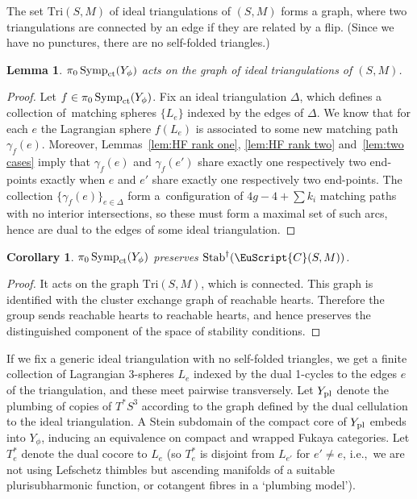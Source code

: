 \documentclass[10pt,a4paper]{amsart}
\newcommand{\scrC}{\EuScript{C}}
\DeclareMathOperator{\Symp}{Symp}
\newtheorem{lem}[thm]{Lemma}
\newtheorem{cor}[thm]{Corollary}
\theoremstyle{definition}
\numberwithin{equation}{section}
\begin{document}
The set $\mathrm{Tri}(S,M)$ of ideal triangulations of $(S,M)$ forms a graph, where two triangulations are connected by an edge if they are related by a flip. (Since we have no punctures, there are no self-folded triangles.)

\begin{lem}
$\pi_0\Symp_{\rm ct}(Y_{\phi})$ acts on the graph of ideal triangulations of $(S,M)$.
\end{lem}

\begin{proof}
Let $f \in \pi_0\Symp_{\rm ct}(Y_{\phi})$. Fix an ideal triangulation $\Delta$, which defines a collection of~matching spheres $\{L_e\}$ indexed by the edges of $\Delta$. We know that for each $e$ the Lagrangian sphere $f(L_e)$ is associated to some new matching path $\gamma_f(e)$. Moreover, Lemmas~\ref{lem:HF rank one}, \ref{lem:HF rank two} and~\ref{lem:two cases} imply that $\gamma_f(e)$ and $\gamma_f(e')$ share exactly one respectively two end-points exactly when $e$ and $e'$ share exactly one respectively two end-points. The collection $\{\gamma_f(e)\}_{e\in \Delta}$ form a~configuration of $4g-4+\sum k_i$ matching paths with no interior intersections, so these must form a maximal set of such arcs, hence are dual to the edges of some ideal trian\-gula\-tion.
\end{proof}

\begin{cor}
$\pi_0\Symp_{\rm ct}(Y_{\phi})$ preserves $\mathrm{Stab}^{\dagger}(\scrC(S,M))$.
\end{cor}

\begin{proof}
It acts on the graph $\mathrm{Tri}(S,M)$, which is connected. This graph is identified \cite{King-QiuYu} with the cluster exchange graph of reachable hearts. Therefore the group sends reachable hearts to reachable hearts, and hence preserves the distinguished component of the space of stability conditions.
\end{proof}


If we fix a generic ideal triangulation with no self-folded triangles, we get a finite collection of Lagrangian 3-spheres $L_e$ indexed by the dual 1-cycles to the edges $e$ of the triangulation, and these meet pairwise transversely. Let $Y_{\rm pl}$ denote the plumbing of copies of $T^*S^3$ according to the graph defined by the dual cellulation to the ideal triangulation. A Stein subdomain of the compact core of $Y_{\rm pl}$ embeds into $Y_{\phi}$, inducing an equivalence on compact and wrapped Fukaya categories. Let $T_e^*$ denote the dual cocore to $L_e$ (so $T_e^*$ is disjoint from $L_{e'}$ for $e' \neq e$, i.e.,~we are not using Lefschetz thimbles but ascending manifolds of a suitable plurisubharmonic function, or cotangent fibres in a `plumbing model').
\end{document}
